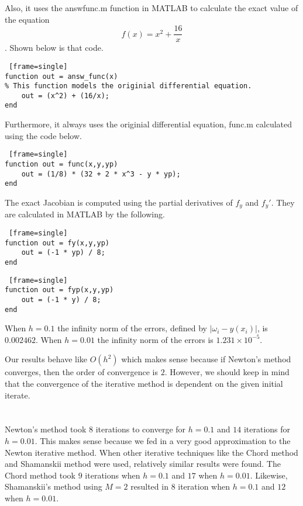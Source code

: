 \documentclass[paper=a4, fontsize=11pt]{scrartcl} %
\numberwithin{equation}{section} %
\numberwithin{figure}{section} %
\numberwithin{table}{section} %
\begin{document}
Also, it uses the answ\textunderscore func.m function in MATLAB to calculate the exact value of the equation $$f(x) = x^2 + \frac{16}{x}$$.  Shown below is that code.  

\begin{lstlisting} [frame=single]
function out = answ_func(x)
% This function models the originial differential equation.  
    out = (x^2) + (16/x);
end
\end{lstlisting}

Furthermore, it always uses the originial differential equation, func.m calculated using the code below.  

\begin{lstlisting} [frame=single]
function out = func(x,y,yp)
    out = (1/8) * (32 + 2 * x^3 - y * yp);
end
\end{lstlisting}

The exact Jacobian is computed using the partial derivatives of $f_y$ and $f_y'$.  They are calculated in MATLAB by the following.  

\begin{lstlisting} [frame=single]
function out = fy(x,y,yp)
    out = (-1 * yp) / 8;
end
\end{lstlisting}

\begin{lstlisting} [frame=single]
function out = fyp(x,y,yp)
    out = (-1 * y) / 8;
end
\end{lstlisting}

\bigskip

When $h=0.1$ the infinity norm of the errors, defined by $|\omega_i-y(x_i)|$, is $0.002462$.  
When $h=0.01$ the infinity norm of the errors is $1.231 \times 10^{-5}$.

Our results behave like $O(h^2)$ which makes sense because if Newton's method converges, then the order of convergence is $2$.  However, we should keep in mind that the convergence of the iterative method is dependent on the given initial iterate.  


\clearpage


\section{}

Newton's method took $8$ iterations to converge for $h=0.1$ and $14$ iterations for $h=0.01$.  This makes sense because we fed in a very good approximation to the Newton iterative method.  When other iterative techniques like the Chord method and Shamanskii method were used, relatively similar results were found.  The Chord method took $9$ iterations when $h=0.1$ and $17$ when $h=0.01$.  Likewise, Shamanskii's method using $M=2$ resulted in $8$ iteration when $h=0.1$ and $12$ when $h=0.01$.  
\end{document}
